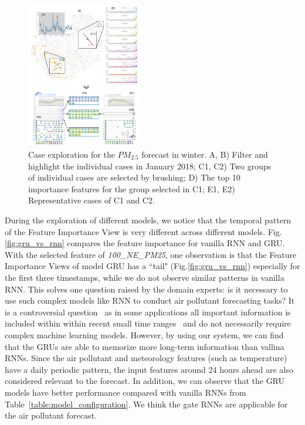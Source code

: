 \begin{figure}[t]
	\centering
	\includegraphics[width=0.45\textwidth]{pictures/Evaluation/winter_exploration.pdf}
	\vspace{-3mm}
	\caption{	Case exploration for the $PM_{2.5}$ forecast in winter. A, B) Filter and highlight the individual cases in January 2018; C1, C2) Two groups of individual cases are selected by brushing; D) The top 10 importance features for the group selected in C1; E1, E2) Representative cases of C1 and C2.}
	\label{fig:winter_exploration}
	\vspace{-4mm}
\end{figure}
During the exploration of different models, we notice that the temporal pattern of the Feature Importance View is very different across different models. 
Fig.\ref{fig:gru_vs_rnn} compares the feature importance for vanilla RNN and GRU.
With the selected feature of \textit{100\_NE\_PM25}, one observation is that the Feature Importance Views of model GRU has a ``tail" (Fig.\ref{fig:gru_vs_rnn}) especially for the first three timestamps, while we do not observe similar patterns in vanilla RNN.
This solves one question raised by the domain experts: is it necessary to use such complex models like RNN to conduct air pollutant forecasting tasks?
It is a controversial question~\cite{brownlee2017long} as in some applications all important information is included within within recent small time ranges~\cite{gers2002applying} and do not necessarily require complex machine learning models. 
However, by using our system, we can find that the GRUs are able to memorize more long-term information than vallina RNNs. 
Since the air pollutant and meteorology features (such as temperature) have a daily periodic pattern, the input features around 24 hours ahead are also considered relevant to the forecast. 
In addition, we can observe that the GRU models have better performance compared with vanilla RNNs from Table~\ref{table:model_configuration}. 
We think the gate RNNs are applicable for the air pollutant forecast. 

